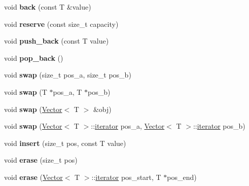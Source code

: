 \begin{DoxyCompactItemize}
void {\bfseries back} (const T \&value)
\item 
\mbox{\label{class_vector_ae3eb542563171ddead064b8575f2387a}} 
void {\bfseries reserve} (const size\+\_\+t capacity)
\item 
\mbox{\label{class_vector_a2069a2b7351a15731b7cfc3987a4060a}} 
void {\bfseries push\+\_\+back} (const T value)
\item 
\mbox{\label{class_vector_adcba035109febbe55cba2a25f8483ba6}} 
void {\bfseries pop\+\_\+back} ()
\item 
\mbox{\label{class_vector_a8faa28b14e6ee2aaa143df155b34303b}} 
void {\bfseries swap} (size\+\_\+t pos\+\_\+a, size\+\_\+t pos\+\_\+b)
\item 
\mbox{\label{class_vector_a7e11a8c935ff98e2da1a8e0e5fe1c090}} 
void {\bfseries swap} (T $\ast$pos\+\_\+a, T $\ast$pos\+\_\+b)
\item 
\mbox{\label{class_vector_af0f182dfb2761aa44be362f74924ff89}} 
void {\bfseries swap} (\mbox{\hyperlink{class_vector}{Vector}}$<$ T $>$ \&obj)
\item 
\mbox{\label{class_vector_aa357b656d743e36c2d2996b85c13a622}} 
void {\bfseries swap} (\mbox{\hyperlink{class_vector}{Vector}}$<$ T $>$\+::\mbox{\hyperlink{class_vector_1_1iterator}{iterator}} pos\+\_\+a, \mbox{\hyperlink{class_vector}{Vector}}$<$ T $>$\+::\mbox{\hyperlink{class_vector_1_1iterator}{iterator}} pos\+\_\+b)
\item 
\mbox{\label{class_vector_a438789fc7cdc876675c303a32e8b9dce}} 
void {\bfseries insert} (size\+\_\+t pos, const T value)
\item 
\mbox{\label{class_vector_a900e7440e4c7568eb343f95f1b174849}} 
void {\bfseries erase} (size\+\_\+t pos)
\item 
\mbox{\label{class_vector_a78f48ef2cd9cbe4afaa2aa23a1768416}} 
void {\bfseries erase} (\mbox{\hyperlink{class_vector}{Vector}}$<$ T $>$\+::\mbox{\hyperlink{class_vector_1_1iterator}{iterator}} pos\+\_\+start, T $\ast$pos\+\_\+end)

\end{DoxyCompactItemize}
